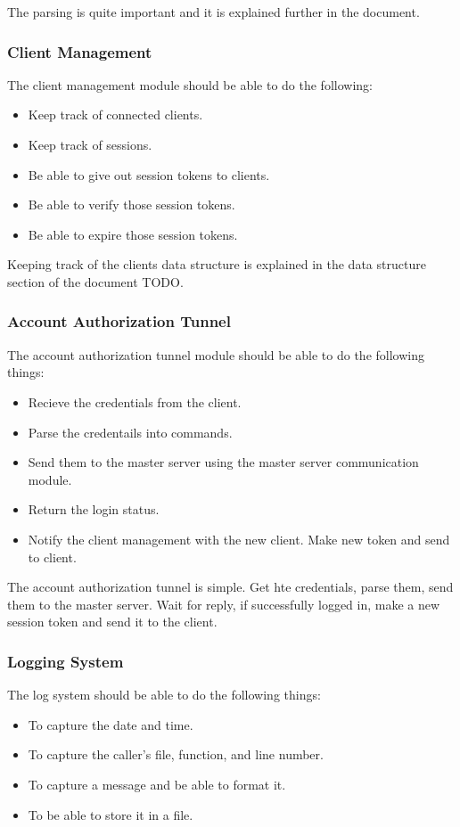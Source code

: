 \documentclass[a4paper]{article}
\begin{document}
The parsing is quite important and it is explained further in the document.

\subsubsection{Client Management}
The client management module should be able to do the following:
\begin{itemize}
	\item Keep track of connected clients.
	\item Keep track of sessions.
	\item Be able to give out session tokens to clients.
	\item Be able to verify those session tokens.
	\item Be able to expire those session tokens.
\end{itemize}

Keeping track of the clients data structure is explained in the data structure
section of the document TODO.

\subsubsection{Account Authorization Tunnel}
The account authorization tunnel module should be able to do the following
things:
\begin{itemize}
	\item Recieve the credentials from the client.
	\item Parse the credentails into commands.
	\item Send them to the master server using the master server communication
		module.
	\item Return the login status.
	\item Notify the client management with the new client. Make new token and
		send to client.
\end{itemize}

The account authorization tunnel is simple. Get hte credentials, parse them,
send them to the master server. Wait for reply, if successfully logged in, make
a new session token and send it to the client.

\subsubsection{Logging System}
The log system should be able to do the following things:
\begin{itemize}
	\item To capture the date and time.
	\item To capture the caller's file, function, and line number.
	\item To capture a message and be able to format it.
	\item To be able to store it in a file.
\end{itemize}
\end{document}

